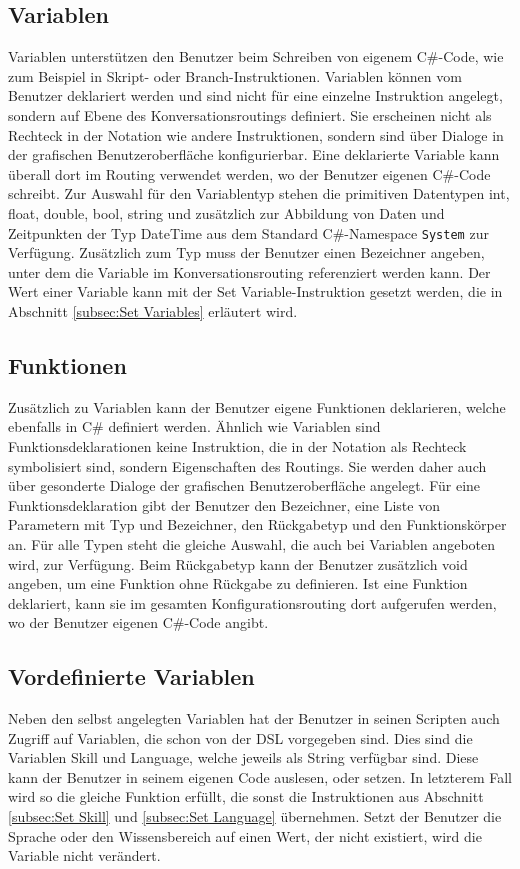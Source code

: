 \subsection{Variablen}
\label{subsec:Variablen}
Variablen unterstützen den Benutzer beim Schreiben von eigenem C\#-Code, wie zum Beispiel in Skript- oder Branch-Instruktionen. Variablen können vom Benutzer deklariert werden und sind nicht für eine einzelne Instruktion angelegt, sondern auf Ebene des Konversationsroutings definiert. Sie erscheinen nicht als Rechteck in der Notation wie andere Instruktionen, sondern sind über Dialoge in der grafischen Benutzeroberfläche konfigurierbar. Eine deklarierte Variable kann überall dort im Routing verwendet werden, wo der Benutzer eigenen C\#-Code schreibt. Zur Auswahl für den Variablentyp stehen die primitiven Datentypen int, float, double, bool, string und zusätzlich zur Abbildung von Daten und Zeitpunkten der Typ DateTime aus dem Standard C\#-Namespace \texttt{System} zur Verfügung. Zusätzlich zum Typ muss der Benutzer einen Bezeichner angeben, unter dem die Variable im Konversationsrouting referenziert werden kann. Der Wert einer Variable kann mit der Set Variable-Instruktion gesetzt werden, die in Abschnitt \ref{subsec:Set Variables} erläutert wird. 

\subsection{Funktionen}
Zusätzlich zu Variablen kann der Benutzer eigene Funktionen deklarieren, welche ebenfalls in C\# definiert werden. Ähnlich wie Variablen sind Funktionsdeklarationen keine Instruktion, die in der Notation als Rechteck symbolisiert sind, sondern Eigenschaften des Routings. Sie werden daher auch über gesonderte Dialoge der grafischen Benutzeroberfläche angelegt. Für eine Funktionsdeklaration gibt der Benutzer den Bezeichner, eine Liste von Parametern mit Typ und Bezeichner, den Rückgabetyp und den Funktionskörper an. Für alle Typen steht die gleiche Auswahl, die auch bei Variablen angeboten wird, zur Verfügung. Beim Rückgabetyp kann der Benutzer zusätzlich void angeben, um eine Funktion ohne Rückgabe zu definieren. Ist eine Funktion deklariert, kann sie im gesamten Konfigurationsrouting dort aufgerufen werden, wo der Benutzer eigenen C\#-Code angibt.  

\subsection{Vordefinierte Variablen}
Neben den selbst angelegten Variablen hat der Benutzer in seinen Scripten auch Zugriff auf Variablen, die schon von der DSL vorgegeben sind. Dies sind die Variablen Skill und Language, welche jeweils als String verfügbar sind. Diese kann der Benutzer in seinem eigenen Code auslesen, oder setzen. In letzterem Fall wird so die gleiche Funktion erfüllt, die sonst die Instruktionen aus Abschnitt \ref{subsec:Set Skill} und \ref{subsec:Set Language} übernehmen. Setzt der Benutzer die Sprache oder den Wissensbereich auf einen Wert, der nicht existiert, wird die Variable nicht verändert. 


